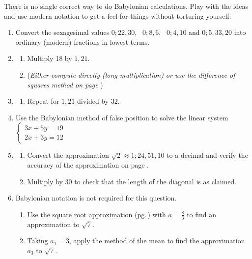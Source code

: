 \begin{exercises*}{}{}
	There is no single correct way to do Babylonian calculations. Play with the ideas and use modern  notation to get a feel for things without torturing yourself.
	
	\begin{enumerate}
	  \item %
	  Convert the sexagesimal values $0;22,30$, \ $0;8,6$, \ $0;4,10$ and $0;5,33,20$ into ordinary (modern) fractions in lowest terms.
	  
	  
	  \item\begin{enumerate}%
	    \item {}\lstsp Multiply 18 by $1,21$.
	    \item[](\emph{Either compute directly (long multiplication) or use the difference of squares method on page \pageref{babmult}})
	  \end{enumerate}
	  
	  
	  \item\begin{enumerate}%
	    \item {}\lstsp Repeat for $1,21$ divided by 32.
	  \end{enumerate}
	
	
		\item Use the Babylonian method of false position to solve the linear system $\begin{cases}
		3x+5y=19\\
		2x+3y=12
		\end{cases}$
	  
	  
	  \item%
	  \begin{enumerate}
	    \item Convert the approximation $\sqrt 2\approx 1;24,51,10$ to a decimal and verify the accuracy of the approximation on page \pageref{ybc7289}.
	    \item Multiply by 30 to check that the length of the diagonal is as claimed.
	  \end{enumerate}
	  
	  
	  \item Babylonian notation is not required for this question.
	  \begin{enumerate}
	    \item Use the square root approximation (pg.\,\pageref{babroot}) with $a=\frac 83$ to find an approximation to $\sqrt 7$.
	    \item Taking $a_1=3$, apply the method of the mean to find the approximation $a_3$ to $\sqrt 7$.
	  \end{enumerate}
	  

\end{enumerate}
\end{exercises*}

